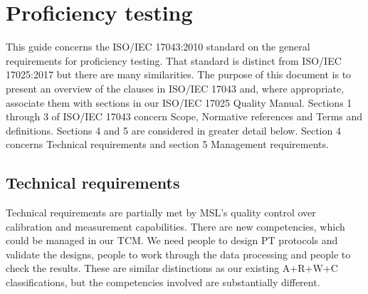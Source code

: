 \section{Proficiency testing}
This guide concerns the ISO/IEC 17043:2010 standard on the general requirements for proficiency testing. That standard is distinct from ISO/IEC 17025:2017 but there are many similarities. The purpose of this document is to present an overview of the clauses in ISO/IEC 17043 and, where appropriate, associate them with sections in our ISO/IEC 17025 Quality Manual. 
Sections 1 through 3 of ISO/IEC 17043 concern Scope, Normative references and Terms and definitions. Sections 4 and 5 are considered in greater detail below. Section 4 concerns Technical requirements and section 5 Management requirements.

\subsection{Technical requirements}

Technical requirements are partially met by MSL's quality control over calibration and measurement capabilities. There are new competencies, which could be managed in our TCM. We need people to design PT protocols and validate the designs, people to work through the data processing and people to check the results. These are similar distinctions as our existing A+R+W+C classifications, but the competencies involved are substantially different.

